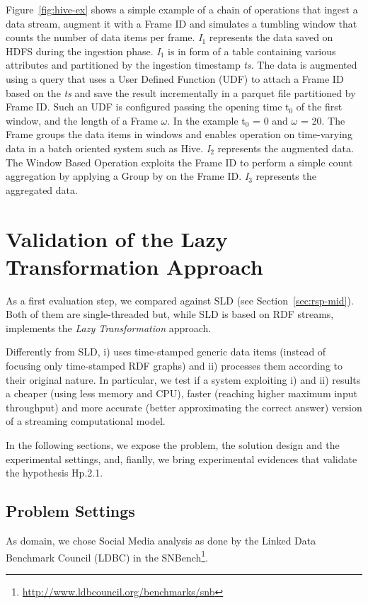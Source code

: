{Figure~\ref{fig:hive-ex} shows a simple example of a chain of operations that ingest a data stream, augment it with a Frame ID and simulates a tumbling window that counts the number of data items per frame. \textit{I$_1$} represents the data saved on HDFS during the ingestion phase. \textit{I$_1$} is in form of a table containing various attributes and partitioned by the ingestion timestamp \textit{ts}. The data is augmented using a query that uses a User Defined Function (UDF) to attach a Frame ID based on the \textit{ts} and save the result incrementally in a parquet file partitioned by Frame ID. Such an UDF is configured passing the opening time t$_0$ of the first window, and the length of a Frame  $\omega$. In the example t$_0$ = 0 and $\omega$ = 20. The Frame groups the data items in windows and enables operation on time-varying data in a batch oriented system such as Hive. \textit{I$_2$} represents the augmented data. The Window Based Operation exploits the Frame ID to perform a simple count aggregation by applying a Group by on the Frame ID.  \textit{I$_3$} represents the aggregated data.

\section{Validation of the Lazy Transformation Approach} \label{sec:comp-mod-eval-performace}

As a first evaluation step, we compared \sti{} against SLD (see Section~\ref{sec:rsp-mid}). Both of them are single-threaded but, while SLD is based on RDF streams, \sti{} implements the \textit{Lazy Transformation} approach.

Differently from SLD, \sti{} i) uses time-stamped generic data items (instead of focusing only time-stamped RDF graphs) and ii) processes them according to their original nature.
In particular, we test if a system exploiting i) and ii) results a cheaper (using less memory and CPU), faster (reaching higher maximum input throughput) and more accurate (better approximating the correct answer) version of a streaming computational model.

In the following sections, we expose the problem, the solution design and the experimental settings, and, fianlly, we bring experimental evidences that validate the hypothesis \textsf{Hp.2.1}.

\subsection{Problem Settings}
As domain, we chose Social Media analysis as done by the Linked Data Benchmark Council (LDBC) in the SNBench\footnote{\url{http://www.ldbcouncil.org/benchmarks/snb}}. 

}
